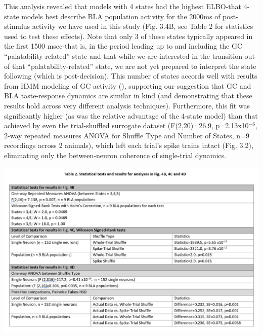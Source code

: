 \begin{refsection}
This analysis revealed that models with 4 states had the highest ELBO-that 4-state models best describe BLA population activity for the 2000ms of post-stimulus activity we have used in this study (Fig. 3.4B, see Table 2 for statistics used to test these effects). Note that only 3 of these states typically appeared in the first 1500 msec-that is, in the period leading up to and including the GC “palatability-related” state-and that while we are interested in the transition out of that “palatability-related” state, we are not yet prepared to interpret the state following (which is post-decision). This number of states accords well with results from HMM modeling of GC activity (\cite{jones2007a,sadacca2016a}), supporting our suggestion that GC and BLA taste-response dynamics are similar in kind (and demonstrating that these results hold across very different analysis techniques). Furthermore, this fit was significantly higher (as was the relative advantage of the 4-state model) than that achieved by even the trial-shuffled surrogate dataset (F(2,20)=26.9, p=2.13x10$^{-6}$, 2-way repeated measures ANOVA for Shuffle Type and Number of States, n=9 recordings across 2 animals), which left each trial’s spike trains intact (Fig. 3.2), eliminating only the between-neuron coherence of single-trial dynamics. 

\begin{tabular}
\centering
    \includegraphics[width=\linewidth]{mahmood_22_figures/table2.PNG}
\end{tabular}


\end{refsection}
